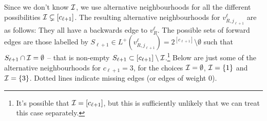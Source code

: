 \documentclass{article}
\renewcommand{\>}{\rangle}
\newcommand{\<}{\langle}
\renewcommand{\(}{\left(}
\renewcommand{\)}{\right)}
\begin{document}
Since we don't know ${\cal I}$, we use alternative neighbourhoods for all the different possibilities ${\cal I}\subsetneq [c_{\ell+1}]$. 
The resulting alternative neighbourhoods for $v_{R,j_{\ell+1}}^{\ell}$ are as follows: They all have a backwards edge to $v_{R}^{\ell}$. The possible sets of forward edges are those labelled by $S_{\ell+1}\in L^+(v_{R,j_{\ell+1}}^\ell)=2^{[c_{\ell+1}]}\setminus\emptyset$ such that $S_{\ell+1}\cap {\cal I} = \emptyset$ -- that is non-empty $S_{\ell+1}\subset [c_{\ell+1}]\setminus {\cal I}$.\footnote{It's possible that ${\cal I}=[c_{\ell+1}]$, but this is sufficiently unlikely that we can treat this case separately.} Below are just some of the alternative neighbourhoods for $c_{\ell+1}=3$, for the choices ${\cal I}=\emptyset$, ${\cal I}=\{1\}$ and ${\cal I}=\{3\}$. Dotted lines indicate missing edges (or edges of weight 0). 
\end{document}
